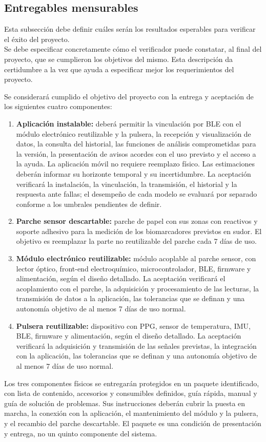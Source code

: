\subsection{Entregables mensurables}
{\consigna
Esta subsección debe definir cuáles serán los resultados esperables para verificar el éxito del proyecto.\\
Se debe especificar concretamente cómo el verificador puede constatar, al final del proyecto, que se cumplieron los objetivos del mismo. Esta descripción da certidumbre a la vez que ayuda a especificar mejor los requerimientos del proyecto.
}


Se considerará cumplido el objetivo del proyecto con la entrega y aceptación de los siguientes cuatro componentes:

\begin{enumerate}
    \item \textbf{Aplicación instalable:} deberá permitir la vinculación por BLE con el módulo electrónico reutilizable y la pulsera, la recepción y visualización de datos, la consulta del historial, las funciones de análisis comprometidas para la versión, la presentación de avisos acordes con el uso previsto y el acceso a la ayuda. La aplicación móvil no requiere reemplazo físico. Las estimaciones deberán informar su horizonte temporal y su incertidumbre. La aceptación verificará la instalación, la vinculación, la transmisión, el historial y la respuesta ante fallas; el desempeño de cada modelo se evaluará por separado conforme a los umbrales pendientes de definir.
    \item \textbf{Parche sensor descartable:} parche de papel con sus zonas con reactivos y soporte adhesivo para la medición de los biomarcadores previstos en sudor. El objetivo es reemplazar la parte no reutilizable del parche cada 7 días de uso.
    \item \textbf{Módulo electrónico reutilizable:} módulo acoplable al parche sensor, con lector óptico, front-end electroquímico, microcontrolador, BLE, firmware y alimentación, según el diseño detallado. La aceptación verificará el acoplamiento con el parche, la adquisición y procesamiento de las lecturas, la transmisión de datos a la aplicación, las tolerancias que se definan y una autonomía objetivo de al menos 7 días de uso normal.
    \item \textbf{Pulsera reutilizable:} dispositivo con PPG, sensor de temperatura, IMU, BLE, firmware y alimentación, según el diseño detallado. La aceptación verificará la adquisición y transmisión de las señales previstas, la integración con la aplicación, las tolerancias que se definan y una autonomía objetivo de al menos 7 días de uso normal. 
\end{enumerate}

Los tres componentes físicos se entregarán protegidos en un paquete identificado, con lista de contenido, accesorios y consumibles definidos, guía rápida, manual y guía de solución de problemas. Sus instrucciones deberán cubrir la puesta en marcha, la conexión con la aplicación, el mantenimiento del módulo y la pulsera, y el recambio del parche descartable. El paquete es una condición de presentación y entrega, no un quinto componente del sistema.

\newpage
